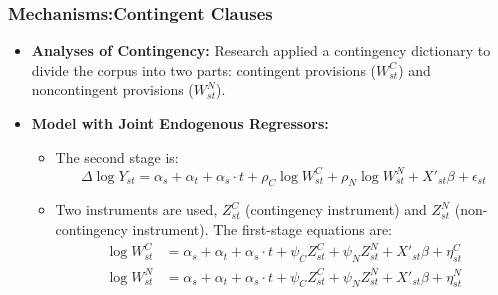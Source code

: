 \documentclass{beamer}
\begin{document}
\begin{frame}
    \frametitle{Mechanisms:Contingent Clauses}
    \footnotesize
    \begin{itemize}
        \item \textbf{Analyses of Contingency:} Research applied a contingency dictionary to divide the corpus into two parts: contingent provisions ($W_{st}^C$) and noncontingent provisions ($W_{st}^N$).
        \item \textbf{Model with Joint Endogenous Regressors:}
        \begin{itemize}
            \item The second stage is:
            \begin{equation*}
                \Delta \log Y_{st} = \alpha_s + \alpha_t + \alpha_s \cdot t + \rho_C \log W_{st}^C + \rho_N \log W_{st}^N + X'_{st}\beta + \epsilon_{st}
            \end{equation*}
            \item Two instruments are used, $Z_{st}^C$ (contingency instrument) and $Z_{st}^N$ (non-contingency instrument). The first-stage equations are:
            \begin{align*}
                \log W_{st}^C &= \alpha_s + \alpha_t + \alpha_s \cdot t + \psi_C Z_{st}^C + \psi_N Z_{st}^N + X'_{st}\beta + \eta_{st}^C \\
                \log W_{st}^N &= \alpha_s + \alpha_t + \alpha_s \cdot t + \psi_C Z_{st}^C + \psi_N Z_{st}^N + X'_{st}\beta + \eta_{st}^N
            \end{align*}
        \end{itemize}
    \end{itemize}
\end{frame}
\end{document}
